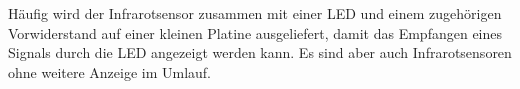 Häufig wird der Infrarotsensor zusammen mit einer LED und einem zugehörigen Vorwiderstand auf einer kleinen Platine ausgeliefert, damit das Empfangen eines Signals durch die LED angezeigt werden kann. Es sind aber auch Infrarotsensoren ohne weitere Anzeige im Umlauf.

%	
%	
\medskip

